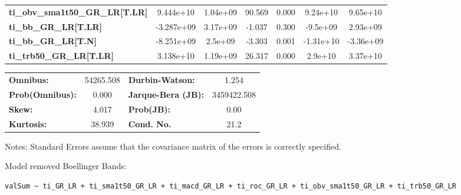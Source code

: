 \begin{center}
\begin{tabular}{lcccccc}
\textbf{ti\_obv\_sma1t50\_GR\_LR[T.LR]} &    9.444e+10  &     1.04e+09     &    90.569  &         0.000        &     9.24e+10    &     9.65e+10     \\
\textbf{ti\_bb\_GR\_LR[T.LR]}           &   -3.287e+09  &     3.17e+09     &    -1.037  &         0.300        &     -9.5e+09    &     2.93e+09     \\
\textbf{ti\_bb\_GR\_LR[T.N]}            &   -8.251e+09  &      2.5e+09     &    -3.303  &         0.001        &    -1.31e+10    &    -3.36e+09     \\
\textbf{ti\_trb50\_GR\_LR[T.LR]}        &    3.138e+10  &     1.19e+09     &    26.317  &         0.000        &      2.9e+10    &     3.37e+10     \\
\bottomrule
\end{tabular}
\begin{tabular}{lclc}
\textbf{Omnibus:}       & 54265.508 & \textbf{  Durbin-Watson:     } &      1.254   \\
\textbf{Prob(Omnibus):} &    0.000  & \textbf{  Jarque-Bera (JB):  } & 3459422.508  \\
\textbf{Skew:}          &    4.017  & \textbf{  Prob(JB):          } &       0.00   \\
\textbf{Kurtosis:}      &   38.939  & \textbf{  Cond. No.          } &       21.2   \\
\bottomrule
\end{tabular}
\end{center}

Notes: \newline
 [1] Standard Errors assume that the covariance matrix of the errors is correctly specified.

Model removed Boellinger Bands: \begin{verbatim}valSum ~ ti_GR_LR + ti_sma1t50_GR_LR + ti_macd_GR_LR + ti_roc_GR_LR + ti_obv_sma1t50_GR_LR + ti_trb50_GR_LR\end{verbatim}

